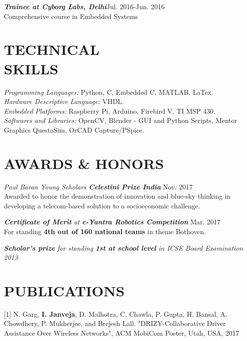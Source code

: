 \documentclass[margin, 10pt]{res} %
\begin{document}
\begin{resume}
{\sl \bf{Trainee at Cyborg Labs, Delhi}}\hfill Jul. 2016-Jun. 2016\\
Comprehensive course in Embedded Systems


\section{TECHNICAL \\ SKILLS} 

{\sl Programming Languages:} Python, C, Embedded C, MATLAB, LaTex. \\
{\sl Hardware Descriptive Language:} VHDL. \\
{\sl Embedded Platforms:} Raspberry Pi, Arduino, Firebird V, TI MSP 430. \\
{\sl Softwares and Libraries:} OpenCV, Blender - GUI and Python Scripts, Mentor Graphics QuestaSim, OrCAD Capture/PSpice. \\ 



\section{AWARDS \& HONORS}
{\sl Paul Baran Young Scholars \bf{Celestini Prize India}} \hfill Nov. 2017 \\Awarded to honor the demonstration of innovation and blue-sky thinking in developing a telecom-based solution to a socioeconomic challenge. 

{\sl {\bf Certificate of Merit} at {\bf e-Yantra Robotics Competition}} \hfill Mar. 2017\\ For standing {\bf 4th out of 160 national teams} in theme Bothoven.

{\sl {\bf Scholar's prize} for standing {\bf 1st at school level} in ICSE Board Examination \hfill 2013}


\section{PUBLICATIONS}
[1] N. Garg, {\bf I. Janveja}, D. Malhotra, C. Chawla, P. Gupta, H. Bansal, A. Chowdhery, P. Mukherjee, and Brejesh Lall. "DRIZY-Collaborative Driver Assistance Over Wireless Networks", ACM MobiCom Poster, Utah, USA, 2017


\end{resume}
\end{document}
